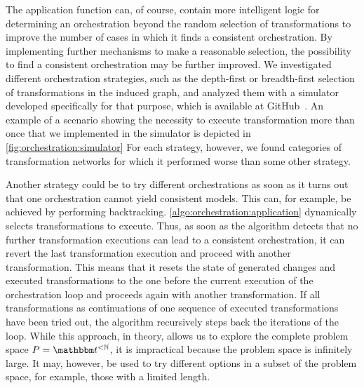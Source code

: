 The application function can, of course, contain more intelligent logic for determining an orchestration beyond the random selection of transformations to improve the number of cases in which it finds a consistent orchestration.
By implementing further mechanisms to make a reasonable selection, the possibility to find a consistent orchestration may be further improved.
We investigated different orchestration strategies, such as the depth-first or breadth-first selection of transformations in the induced graph, and analyzed them with a simulator developed specifically for that purpose, which is available at GitHub~\cite{gleitze2020OrchestrationSimulator}.
An example of a scenario showing the necessity to execute transformation more than once that we implemented in the simulator is depicted in \autoref{fig:orchestration:simulator}
For each strategy, however, we found categories of transformation networks for which it performed worse than some other strategy.

Another strategy could be to try different orchestrations as soon as it turns out that one orchestration cannot yield consistent models.
This can, for example, be achieved by performing backtracking.
\autoref{algo:orchestration:application} dynamically selects transformations to execute. 
Thus, as soon as the algorithm detects that no further transformation executions can lead to a consistent orchestration, it can revert the last transformation execution and proceed with another transformation.
This means that it resets the state of generated changes and executed transformations to the one before the current execution of the orchestration loop and proceeds again with another transformation.
If all transformations as continuations of one sequence of executed transformations have been tried out, the algorithm recursively steps back the iterations of the loop.
While this approach, in theory, allows us to explore the complete problem space $P = \transformationset{T}^{< \mathbb{N}}$, it is impractical because the problem space is infinitely large.
It may, however, be used to try different options in a subset of the problem space, for example, those with a limited length.



